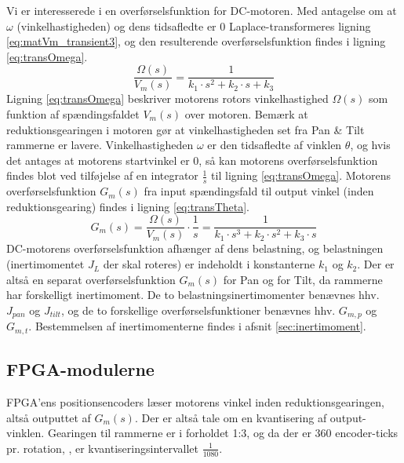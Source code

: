 Vi er interesserede i en overførselsfunktion for DC-motoren. Med antagelse om at \(\omega\) (vinkelhastigheden) og dens tidsafledte er 0
Laplace-transformeres ligning \ref{eq:matVm_transient3}, og den resulterende overførselsfunktion findes
i ligning \ref{eq:transOmega}.
\begin{equation}
	\frac{\Omega\left(s\right)}{V_m\left(s\right)}=\frac{1}{k_1\cdot{}s^2+k_2\cdot{}s+k_3}
	\label{eq:transOmega}
 \end{equation}
Ligning \ref{eq:transOmega} beskriver motorens rotors vinkelhastighed \(\Omega\left(s\right)\) som funktion af spændingsfaldet
\(V_m\left(s\right)\) over motoren. Bemærk at reduktionsgearingen i motoren gør at vinkelhastigheden set fra Pan \& Tilt rammerne
er lavere.
Vinkelhastigheden \(\omega\) er den tidsafledte af vinklen \(\theta\),
og hvis det antages at motorens startvinkel er 0, så kan motorens overførselsfunktion
findes blot ved tilføjelse af en integrator \(\frac{1}{s}\) til ligning \ref{eq:transOmega}.
Motorens overførselsfunktion \(G_m\left(s\right)\) fra input spændingsfald til output vinkel (inden reduktionsgearing) findes
i ligning \ref{eq:transTheta}.
\begin{equation}
	G_m\left(s\right)=\frac{\Omega\left(s\right)}{V_m\left(s\right)}\cdot{}\frac{1}{s}=\frac{1}{k_1\cdot{}s^3+k_2\cdot{}s^2+k_3\cdot{}s}
	\label{eq:transTheta}
\end{equation}
DC-motorens overførselsfunktion afhænger af dens belastning,
og belastningen (inertimomentet \(J_L\) der skal roteres) er indeholdt i konstanterne \(k_1\) og \(k_2\).
Der er altså en separat overførselsfunktion \(G_m\left(s\right)\) for Pan og for Tilt,
da rammerne har forskelligt inertimoment.
De to belastningsinertimomenter benævnes hhv. \(J_{pan}\) og \(J_{tilt}\),
og de to forskellige overførselsfunktioner benævnes hhv. \(G_{m,p}\) og \(G_{m,t}\).
Bestemmelsen af inertimomenterne findes i afsnit \ref{sec:inertimoment}.

\subsection{FPGA-modulerne}
\label{subsec:matFPGA}
FPGA'ens positionsencoders læser motorens vinkel inden reduktionsgearingen,
altså outputtet af \(G_m\left(s\right)\).
Der er altså tale om en kvantisering af output-vinklen.
Gearingen til rammerne er i forholdet 1:3, og da der er 360 encoder-ticks pr. rotation, \citep{emgmotor},
er kvantiseringsintervallet \(\frac{1}{1080}\).

